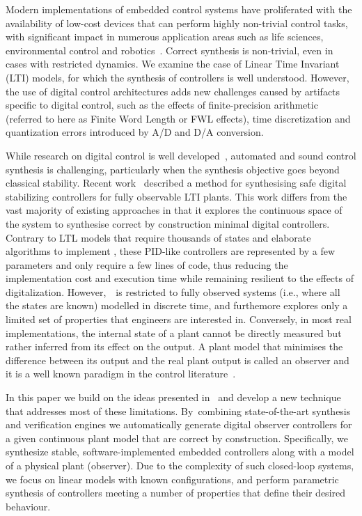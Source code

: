 \documentclass[sigconf]{llncs}
\begin{document}
Modern implementations of embedded control systems have proliferated with
the availability of low-cost devices that can perform highly non-trivial
control tasks, with significant impact in numerous application areas such as
life sciences, environmental control and robotics~\cite{astrom1997computer,Franklin15}.  Correct synthesis is non-trivial, even in cases with
restricted dynamics.  We examine the case of Linear Time Invariant (LTI)
models, for which the synthesis of controllers is well understood.  However,
the use of digital control architectures adds new challenges caused by
artifacts specific to digital control, such as the effects of
finite-precision arithmetic (referred to here as Finite Word Length or FWL effects), time discretization and quantization errors
introduced by A/D and D/A conversion.

While research on digital control is well
developed~\cite{astrom1997computer}, automated and sound control synthesis
is challenging, particularly when the synthesis objective goes beyond
classical stability.  Recent work~\cite{abate2017automated} described a
method for synthesising safe digital stabilizing controllers for fully
observable LTI plants.  This work differs from the vast majority of existing
approaches in that it explores the continuous space of the system to
synthesise correct by construction minimal digital controllers.  Contrary to
LTL models that require thousands of states and elaborate algorithms to
implement \cite{reissig2017feedback}, these PID-like controllers are represented by a few parameters
and only require a few lines of code, thus reducing the implementation cost
and execution time while remaining resilient to the effects of digitalization.
However,~\cite{abate2017automated}~is restricted to fully observed
systems (i.e., where all the states are known) modelled in discrete time,
and furthemore explores only a limited set of properties that engineers
are interested in. Conversely, 
in most real implementations, the internal state of a plant cannot be
directly measured but rather inferred from its
effect on the output. A plant model that minimises the difference
between its output and the real plant output is called an observer and it is a well known
paradigm in the control literature~\cite{astrom1997computer}.


In this paper we build on the ideas presented in~\cite{abate2017automated}
and develop a new technique that addresses most of these limitations. 
By~combining state-of-the-art synthesis and verification engines we
automatically generate digital observer controllers for a given continuous
plant model that are correct by construction.  %
Specifically, we synthesize stable,
software-implemented embedded controllers along with a model of a physical
plant (observer).  Due to the complexity of such closed-loop systems, we focus
on linear models with known configurations, and perform
parametric synthesis of controllers meeting a number of properties that
define their desired behaviour.
\end{document}
